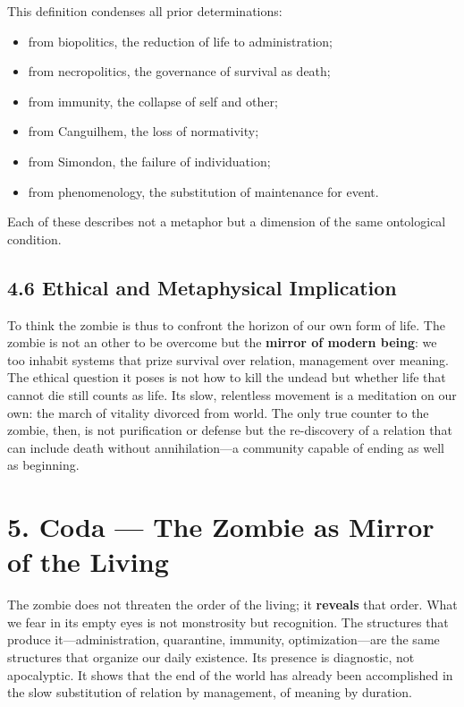 \documentclass[11pt]{article}
\begin{document}
This definition condenses all prior determinations:
\begin{itemize}
\item from biopolitics, the reduction of life to administration;
\item from necropolitics, the governance of survival as death;
\item from immunity, the collapse of self and other;
\item from Canguilhem, the loss of normativity;
\item from Simondon, the failure of individuation;
\item from phenomenology, the substitution of maintenance for event.
\end{itemize}

Each of these describes not a metaphor but a dimension of the same ontological condition.
\subsection*{4.6 Ethical and Metaphysical Implication}
\label{sec:org96d7b14}

To think the zombie is thus to confront the horizon of our own form of life. The zombie is not an other to be overcome but the \textbf{mirror of modern being}: we too inhabit systems that prize survival over relation, management over meaning. The ethical question it poses is not how to kill the undead but whether life that cannot die still counts as life. Its slow, relentless movement is a meditation on our own: the march of vitality divorced from world. The only true counter to the zombie, then, is not purification or defense but the re-discovery of a relation that can include death without annihilation—a community capable of ending as well as beginning.
\section*{5. Coda — The Zombie as Mirror of the Living}
\label{sec:orgc74243c}

The zombie does not threaten the order of the living; it \textbf{reveals} that order. What we fear in its empty eyes is not monstrosity but recognition. The structures that produce it—administration, quarantine, immunity, optimization—are the same structures that organize our daily existence. Its presence is diagnostic, not apocalyptic. It shows that the end of the world has already been accomplished in the slow substitution of relation by management, of meaning by duration.
\end{document}
